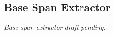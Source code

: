 \subsection{Base Span Extractor}
\label{sec:span-extractor}
\textit{Base span extractor draft pending.}
